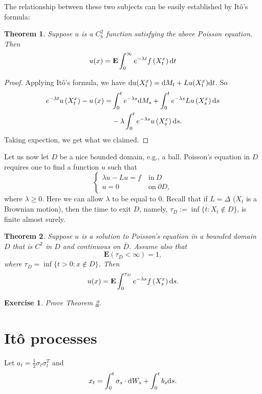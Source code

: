 \documentclass[twoside, 12pt]{book}
\numberwithin{equation}{chapter}
\newtheorem{theorem}{Theorem}[section]
\newtheorem{exercise}{Exercise}[section]
\def\bE{{\mathbf E}}
\def\geq{\geqslant}
\def\p{\partial}
\def\d{\text{\rm{d}}}
\begin{document}
	The relationship between these two subjects can be easily established by It\^o's formula: 
	\begin{theorem}\label{thm:FK1}
		Suppose $u$ is a $C^2_b$ function satisfying the above Poisson equation. Then
		$$
		u(x)=\mathbf{E} \int_0^{\infty} e^{-\lambda t} f\left(X^x_t\right) \d t
		$$
	\end{theorem}
	\begin{proof}
		Applying It\^o's formula, we have 
		$\d u(X^x_t)=\d M_t + Lu(X^x_t) \d t$. So 
		\[
		    \begin{aligned}
		    	e^{-\lambda t} u\left(X_t^x\right)-u\left(x\right)=&\int_0^t e^{-\lambda s} \d M_s+\int_0^t e^{-\lambda s} L u\left(X^x_s\right) \d s \\
		    	&-\lambda \int_0^t e^{-\lambda s} u\left(X^x_s\right) \d s.
		    \end{aligned}
		\]
		Taking expection, we get what we claimed. 
	\end{proof}
	
	Let us now let $D$ be a nice bounded domain, e.g., a ball. Poisson's equation in $D$ requires one to find a function $u$ such that 
	\begin{equation*}
		\begin{cases}
			\lambda u- Lu=f ~&\mbox{in}~ D\\
			u=0 ~&\mbox{on}~ \p D, 
		\end{cases}
	\end{equation*}
	where $\lambda\geq 0$. Here we can allow $\lambda$ to be equal to $0$. Recall that if $L=\Delta$ ($X_t$ is a Brownian motion), then the time to exit $D$, namely, $\tau_D := \inf\{t : X_t \notin D\}$, is finite almost surely. 
	
	\begin{theorem}\label{thm:PR-Dir}
		Suppose $u$ is a solution to Poisson's equation in a bounded domain $D$ that is $C^2$ in $D$ and continuous on $\bar{D}$. Assume also that 
		\begin{equation*}%
			\bE(\tau_D<\infty)=1, 
		\end{equation*}
		where $\tau_D=\inf\{t>0: x\notin D\}$. Then
		\[
		    u(x)=\mathbf{E} \int_0^{\tau_D} e^{-\lambda s} f\left(X_s^x\right) \d s.		
		\]
	\end{theorem}
	\begin{exercise}
		Prove Theorem \ref{thm:PR-Dir}. 
	\end{exercise}
	
	
	\chapter{It\^o processes}\label{chapt:Ito}
	Let $a_t=\frac{1}{2} \sigma_t\sigma_t^{T}$ and 
	\begin{equation}\label{eq:Ito-process}
		x_t= \int_0^t \sigma_s \cdot \d W_s+\int_0^t b_s \d s . 
	\end{equation}
	
\end{document}
